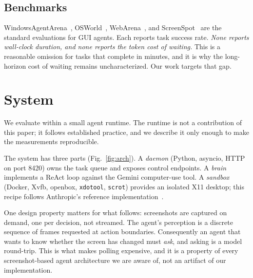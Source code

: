 \documentclass[conference]{IEEEtran}
\begin{document}
\subsection{Benchmarks}
\label{sec:gap}
WindowsAgentArena~\cite{waa}, OSWorld~\cite{osworld}, WebArena~\cite{webarena},
and ScreenSpot~\cite{seeclick} are the standard evaluations for GUI agents. Each
reports task success rate. \emph{None reports wall-clock duration, and none
reports the token cost of waiting.} This is a reasonable omission for tasks that
complete in minutes, and it is why the long-horizon cost of waiting remains
uncharacterized. Our work targets that gap.

\section{System}

We evaluate within a small agent runtime. The runtime is not a contribution of
this paper; it follows established practice, and we describe it only enough to
make the measurements reproducible.

The system has three parts (Fig.~\ref{fig:arch}). A \emph{daemon} (Python, asyncio, HTTP on port 8420)
owns the task queue and exposes control endpoints. A \emph{brain} implements a
ReAct loop against the Gemini computer-use tool. A \emph{sandbox} (Docker, Xvfb,
openbox, \texttt{xdotool}, \texttt{scrot}) provides an isolated X11 desktop; this
recipe follows Anthropic's reference implementation~\cite{anthropic}.

One design property matters for what follows: screenshots are captured on
demand, one per decision, not streamed. The agent's perception is a discrete
sequence of frames requested at action boundaries. Consequently an agent that
wants to know whether the screen has changed must \emph{ask}, and asking is a
model round-trip. This is what makes polling expensive, and it is a property of
every screenshot-based agent architecture we are aware of, not an artifact of our
implementation.
\end{document}
